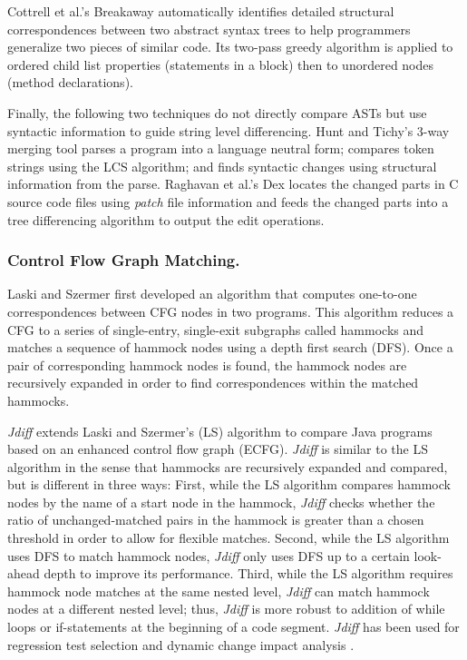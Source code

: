 \documentclass[runningheads,a4paper]{llncs}
\begin{document}
Cottrell et al.'s Breakaway \cite{Cottrell:2007} automatically identifies detailed structural correspondences between two abstract syntax trees to help programmers generalize two pieces of similar code. Its two-pass greedy algorithm is applied to ordered child list properties (statements in a block) then to unordered nodes (method declarations). 

Finally, the following two techniques do not directly compare ASTs but use syntactic information to guide string level differencing. 
Hunt and Tichy's 3-way merging tool \cite{Hunt2002} parses a program into a language neutral form; compares token strings using the LCS algorithm; and finds syntactic changes using structural information from the parse.
Raghavan et al.'s Dex \cite{Raghavan:2004:Dex} locates the changed parts in C source code files using {\it patch} file information and feeds the changed parts into a tree differencing algorithm to output the edit operations. 

\subsubsection{Control Flow Graph Matching.}
Laski and Szermer \cite{Laski1992} first developed an algorithm that computes one-to-one correspondences between CFG nodes in two programs. This algorithm reduces a CFG to a series of single-entry, single-exit subgraphs called hammocks and matches a sequence of hammock nodes using a depth first search (DFS). Once a pair of corresponding hammock nodes is found, the hammock nodes are recursively expanded in order to find correspondences within the matched hammocks. 
 
\textit{Jdiff} \cite{Apiwattanapong2004} extends Laski and Szermer's (LS) algorithm to compare Java programs based on an enhanced control flow graph (ECFG). 
\textit{Jdiff} is similar to the LS algorithm in the sense that hammocks are recursively expanded and compared, but is different in three ways: 
First, while the LS algorithm compares hammock nodes by the name of a start node in the hammock, \textit{Jdiff} checks whether the ratio of unchanged-matched pairs in the hammock is greater than a chosen threshold in order to allow for flexible matches.
Second, while the LS algorithm uses DFS to match hammock nodes, \textit{Jdiff} only uses DFS up to a certain look-ahead depth to improve its performance. 
Third, while the LS algorithm requires hammock node matches at the same nested level, \textit{Jdiff} can match hammock nodes at a different nested level; thus, \textit{Jdiff} is more robust to addition of while loops or if-statements at the beginning of a code segment. \textit{Jdiff} has been used for regression test selection \cite{Orso2004} and dynamic change impact analysis \cite{Apiwattanapong2005}. 
\end{document}
